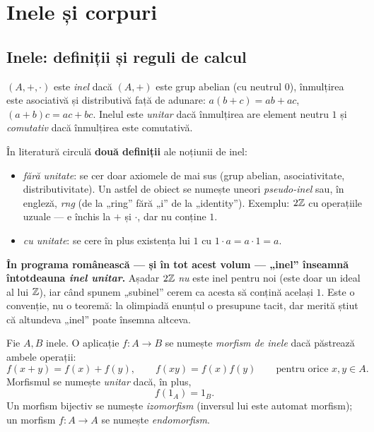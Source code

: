 \chapter{Inele și corpuri}

\section{Inele: definiții și reguli de calcul}

\begin{definitie}
$(A,+,\cdot)$ este \emph{inel} dacă $(A,+)$ este grup abelian (cu neutrul $0$), înmulțirea este asociativă și distributivă față de adunare: $a(b+c)=ab+ac$, $(a+b)c=ac+bc$. Inelul este \emph{unitar} dacă înmulțirea are element neutru $1$ și \emph{comutativ} dacă înmulțirea este comutativă.
\end{definitie}

\begin{observatie}\label{obs:conventieinel}
În literatură circulă \textbf{două definiții} ale noțiunii de inel:
\begin{itemize}[nosep,leftmargin=1.4em]
\item \emph{fără unitate}: se cer doar axiomele de mai sus (grup abelian, asociativitate, distributivitate). Un astfel de obiect se numește uneori \emph{pseudo-inel} sau, în engleză, \emph{rng} (de la „ring'' fără „i'' de la „identity''). Exemplu: $2\mathbb{Z}$ cu operațiile uzuale --- e închis la $+$ și $\cdot$, dar nu conține $1$.
\item \emph{cu unitate}: se cere în plus existența lui $1$ cu $1\cdot a=a\cdot 1=a$.
\end{itemize}
\textbf{În programa românească --- și în tot acest volum --- „inel'' înseamnă întotdeauna \emph{inel unitar}.} Așadar $2\mathbb{Z}$ \emph{nu} este inel pentru noi (este doar un ideal al lui $\mathbb{Z}$), iar când spunem „subinel'' cerem ca acesta să conțină același $1$. Este o convenție, nu o teoremă: la olimpiadă enunțul o presupune tacit, dar merită știut că altundeva „inel'' poate însemna altceva.
\end{observatie}

\begin{definitie}\label{def:morfinel}
Fie $A,B$ inele. O aplicație $f:A\to B$ se numește \emph{morfism de inele} dacă păstrează ambele operații:
\[
f(x+y)=f(x)+f(y),\qquad f(xy)=f(x)f(y)\qquad\text{pentru orice }x,y\in A.
\]
Morfismul se numește \emph{unitar} dacă, în plus,
\[
f(1_A)=1_B .
\]
Un morfism bijectiv se numește \emph{izomorfism} (inversul lui este automat morfism); un morfism $f:A\to A$ se numește \emph{endomorfism}.
\end{definitie}

